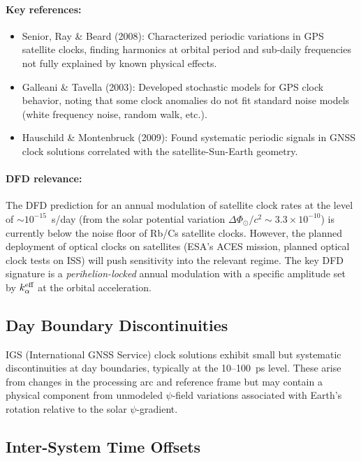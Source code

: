 \documentclass[12pt,letterpaper]{article}
\begin{document}
\paragraph{Key references:}
\begin{itemize}
\item Senior, Ray \& Beard (2008): Characterized periodic variations in
GPS satellite clocks, finding harmonics at orbital period and sub-daily
frequencies not fully explained by known physical effects.
\item Galleani \& Tavella (2003): Developed stochastic models for GPS
clock behavior, noting that some clock anomalies do not fit standard noise
models (white frequency noise, random walk, etc.).
\item Hauschild \& Montenbruck (2009): Found systematic periodic signals in
GNSS clock solutions correlated with the satellite-Sun-Earth geometry.
\end{itemize}

\paragraph{DFD relevance:}
The DFD prediction for an annual modulation of satellite clock rates at
the level of $\sim 10^{-15}$~s/day (from the solar potential variation
$\Delta\Phi_\odot/c^2 \sim 3.3\times10^{-10}$) is currently below the
noise floor of Rb/Cs satellite clocks. However, the planned deployment
of optical clocks on satellites (ESA's ACES mission, planned optical clock
tests on ISS) will push sensitivity into the relevant regime. The
key DFD signature is a \emph{perihelion-locked} annual modulation with a
specific amplitude set by $k_\alpha^{\rm eff}$ at the orbital
acceleration.

\subsection{Day Boundary Discontinuities}

IGS (International GNSS Service) clock solutions exhibit small but systematic
discontinuities at day boundaries, typically at the 10--100~ps level. These
arise from changes in the processing arc and reference frame but may contain
a physical component from unmodeled $\psi$-field variations associated with
Earth's rotation relative to the solar $\psi$-gradient.

\subsection{Inter-System Time Offsets}
\end{document}
